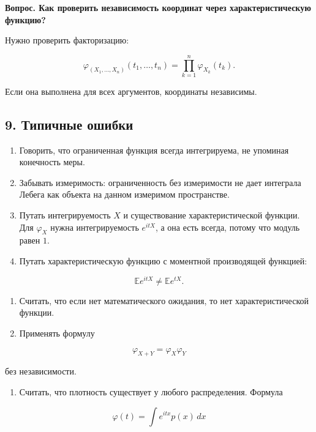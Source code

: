 \documentclass[
  11pt,
  a4paper,
]{article}
\providecommand{\tightlist}{%
  \setlength{\itemsep}{0pt}\setlength{\parskip}{0pt}}
\begin{document}
\textbf{Вопрос. Как проверить независимость координат через
характеристическую функцию?}

Нужно проверить факторизацию:

\[
\varphi_{(X_1,\ldots,X_n)}(t_1,\ldots,t_n)
=
\prod_{k=1}^n\varphi_{X_k}(t_k).
\]

Если она выполнена для всех аргументов, координаты независимы.

\subsection{9. Типичные
ошибки}\label{ux442ux438ux43fux438ux447ux43dux44bux435-ux43eux448ux438ux431ux43aux438}

\begin{enumerate}
\def\labelenumi{\arabic{enumi}.}
\item
  Говорить, что ограниченная функция всегда интегрируема, не упоминая
  конечность меры.
\item
  Забывать измеримость: ограниченность без измеримости не дает интеграла
  Лебега как объекта на данном измеримом пространстве.
\item
  Путать интегрируемость \(X\) и существование характеристической
  функции. Для \(\varphi_X\) нужна интегрируемость \(e^{itX}\), а она
  есть всегда, потому что модуль равен \(1\).
\item
  Путать характеристическую функцию с моментной производящей функцией:
\end{enumerate}

\[
\mathbb E e^{itX}\ne \mathbb E e^{tX}.
\]

\begin{enumerate}
\def\labelenumi{\arabic{enumi}.}
\setcounter{enumi}{4}
\item
  Считать, что если нет математического ожидания, то нет
  характеристической функции.
\item
  Применять формулу
\end{enumerate}

\[
\varphi_{X+Y}=\varphi_X\varphi_Y
\]

без независимости.

\begin{enumerate}
\def\labelenumi{\arabic{enumi}.}
\setcounter{enumi}{6}
\tightlist
\item
  Считать, что плотность существует у любого распределения. Формула
\end{enumerate}

\[
\varphi(t)=\int e^{itx}p(x)\,dx
\]
\end{document}
